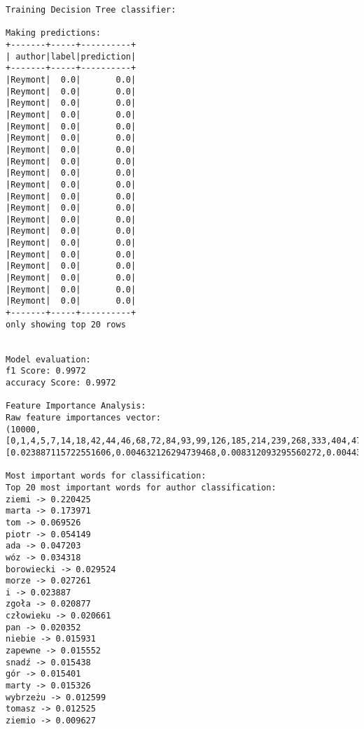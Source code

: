 \documentclass{article}
\begin{document}
\begin{verbatim}
Training Decision Tree classifier:

Making predictions:
+-------+-----+----------+
| author|label|prediction|
+-------+-----+----------+
|Reymont|  0.0|       0.0|
|Reymont|  0.0|       0.0|
|Reymont|  0.0|       0.0|
|Reymont|  0.0|       0.0|
|Reymont|  0.0|       0.0|
|Reymont|  0.0|       0.0|
|Reymont|  0.0|       0.0|
|Reymont|  0.0|       0.0|
|Reymont|  0.0|       0.0|
|Reymont|  0.0|       0.0|
|Reymont|  0.0|       0.0|
|Reymont|  0.0|       0.0|
|Reymont|  0.0|       0.0|
|Reymont|  0.0|       0.0|
|Reymont|  0.0|       0.0|
|Reymont|  0.0|       0.0|
|Reymont|  0.0|       0.0|
|Reymont|  0.0|       0.0|
|Reymont|  0.0|       0.0|
|Reymont|  0.0|       0.0|
+-------+-----+----------+
only showing top 20 rows


Model evaluation:
f1 Score: 0.9972
accuracy Score: 0.9972

Feature Importance Analysis:
Raw feature importances vector:
(10000,[0,1,4,5,7,14,18,42,44,46,68,72,84,93,99,126,185,214,239,268,333,404,478,481,503,551,578,689,726,737,749,818,853,903,911,1071,1076,1088,1214,1269,1448,1512,1528,1738,1789,1796,2461],[0.023887115722551606,0.004632126294739468,0.008312093295560272,0.004433116424298813,0.002955410949532542,0.0027706977651867576,0.020351500744235217,0.006533708088381511,0.003253251570521766,0.0027503249875015638,0.0033007442941790023,0.029523625096953564,0.2204248446714813,0.003277134492271951,0.005171969161681948,0.006368066904000059,0.003220936152029606,0.17397126164134985,0.05414924787635572,0.06952589213215185,0.009220430204750042,0.027261193825600234,0.03431828985126793,0.003282107382244501,0.04720296141707848,0.015325570082783038,0.005171969161681948,0.01593077132154462,0.01540076963790318,0.008471393483807507,0.009498482849887468,0.009540981654584575,0.006480520304874378,0.015438258098096956,0.020660672635427604,0.0032870915999853355,0.012524638502924531,0.006500084139756681,0.004323110984271116,0.02087689333605388,0.009583766325681418,0.015552193582215781,0.003292087179924863,0.003297094156624134,0.009626839432763252,0.006519736699514027,0.012599023883788066])

Most important words for classification:
Top 20 most important words for author classification:
ziemi -> 0.220425
marta -> 0.173971
tom -> 0.069526
piotr -> 0.054149
ada -> 0.047203
wóz -> 0.034318
borowiecki -> 0.029524
morze -> 0.027261
i -> 0.023887
zgoła -> 0.020877
człowieku -> 0.020661
pan -> 0.020352
niebie -> 0.015931
zapewne -> 0.015552
snadź -> 0.015438
gór -> 0.015401
marty -> 0.015326
wybrzeżu -> 0.012599
tomasz -> 0.012525
ziemio -> 0.009627
\end{verbatim}
\end{document}
